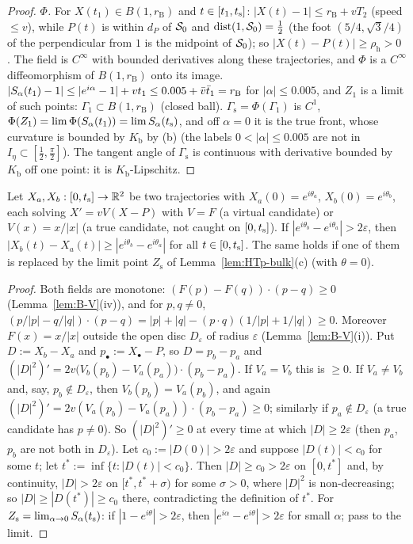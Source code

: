 \begin{proof}
\emph{$\Phi$.} For $X(t_1)\in B(1,r_{\mathrm B})$ and $t\in[t_1,t_{\mathrm s}]$: $|X(t)-1|\le r_{\mathrm B}+vT_2$ (speed $\le v$), while $P(t)$ is
within $d_P$ of $\mathcal S_0$ and $\operatorname{dist}(1,\mathcal S_0)=\frac12$ (the foot $(5/4,\sqrt3/4)$ of the perpendicular from $1$ is the
midpoint of $\mathcal S_0$); so $|X(t)-P(t)|\ge\rho_{\mathrm h}>0$ . The field is $C^\infty$ with bounded derivatives along these
trajectories, and $\Phi$ is a $C^\infty$ diffeomorphism of $B(1,r_{\mathrm B})$ onto its image. $|S_\alpha(t_1)-1|\le|e^{i\alpha}-1|+vt_1\le
0.005+\bar v\bar t_1=r_{\mathrm B}$ for $|\alpha|\le0.005$, and $Z_1$ is a limit of such points: $\Gamma_1\subset B(1,r_{\mathrm B})$ (closed
ball). $\Gamma_{\mathrm s}=\Phi(\Gamma_1)$ is $C^1$, $\Phi(Z_1)=\lim\Phi(S_\alpha(t_1))=\lim S_\alpha(t_{\mathrm s})$, and off $\alpha=0$ it is the true
front, whose curvature is bounded by $K_{\mathrm b}$ by (b) (the labels $0<|\alpha|\le0.005$ are not in $I_\eta\subset[\frac12,\frac\pi2]$).
The tangent angle of $\Gamma_{\mathrm s}$ is continuous with derivative bounded by $K_{\mathrm b}$ off one point: it is
$K_{\mathrm b}$-Lipschitz.
\end{proof}

\begin{lemma}\label{lem:HTp-chord}
Let $X_a,X_b:[0,t_{\mathrm s}]\to\mathbb{R}^2$ be two trajectories with $X_a(0)=e^{i\theta_a}$, $X_b(0)=e^{i\theta_b}$, each solving $X'=vV(X-P)$ with
$V=F$ (a virtual candidate) or $V(x)=x/|x|$ (a true candidate, not caught on $[0,t_{\mathrm s}]$). If $|e^{i\theta_b}-e^{i\theta_a}|>2\varepsilon$,
then $|X_b(t)-X_a(t)|\ge|e^{i\theta_b}-e^{i\theta_a}|$ for all $t\in[0,t_{\mathrm s}]$. The same holds if one of them is replaced by the limit
point $Z_{\mathrm s}$ of Lemma~\ref{lem:HTp-bulk}(c) (with $\theta=0$).
\end{lemma}
\begin{proof}
Both fields are monotone: $(F(p)-F(q))\cdot(p-q)\ge0$ (Lemma~\ref{lem:B-V}(iv)), and for $p,q\ne0$,
$(p/|p|-q/|q|)\cdot(p-q)=|p|+|q|-(p\cdot q)(1/|p|+1/|q|)\ge0$. Moreover $F(x)=x/|x|$ outside the open disc $D_\varepsilon$ of radius
$\varepsilon$ (Lemma~\ref{lem:B-V}(i)). Put $D:=X_b-X_a$ and $p_\bullet:=X_\bullet-P$, so $D=p_b-p_a$ and
$(|D|^2)'=2v\bigl(V_b(p_b)-V_a(p_a)\bigr)\cdot(p_b-p_a)$. If $V_a=V_b$ this is $\ge0$. If $V_a\ne V_b$ and, say, $p_b\notin D_\varepsilon$,
then $V_b(p_b)=V_a(p_b)$, and again $(|D|^2)'=2v(V_a(p_b)-V_a(p_a))\cdot(p_b-p_a)\ge0$; similarly if $p_a\notin D_\varepsilon$ (a true
candidate has $p\ne0$). So $(|D|^2)'\ge0$ at every time at which $|D|\ge2\varepsilon$ (then $p_a$, $p_b$ are not both in $D_\varepsilon$).
Let $c_0:=|D(0)|>2\varepsilon$ and suppose $|D(t)|<c_0$ for some $t$; let $t^*:=\inf\{t:|D(t)|<c_0\}$. Then $|D|\ge c_0>2\varepsilon$ on
$[0,t^*]$ and, by continuity, $|D|>2\varepsilon$ on $[t^*,t^*+\sigma)$ for some $\sigma>0$, where $|D|^2$ is non-decreasing; so
$|D|\ge|D(t^*)|\ge c_0$ there, contradicting the definition of $t^*$. For $Z_{\mathrm s}=\lim_{\alpha\to0}S_\alpha(t_{\mathrm s})$: if
$|1-e^{i\theta}|>2\varepsilon$, then $|e^{i\alpha}-e^{i\theta}|>2\varepsilon$ for small $\alpha$; pass to the limit.
\end{proof}

